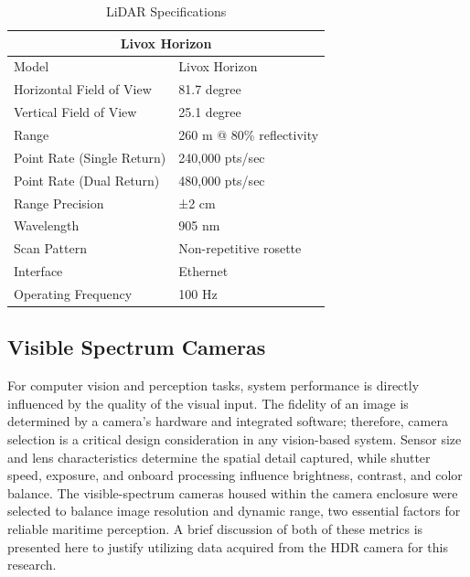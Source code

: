 \documentclass{erauthesis}
\begin{document}
\begin{table}[htpb]
\centering
\begin{tabular}{ll}
\hline
\multicolumn{2}{c}{Livox Horizon}\\
\hline
\hline
Model & Livox Horizon \\
Horizontal Field of View & 81.7 degree \\
Vertical Field of View & 25.1 degree \\
Range & 260 m @ 80\% reflectivity \\
Point Rate (Single Return) & 240,000 pts/sec \\
Point Rate (Dual Return) & 480,000 pts/sec \\
Range Precision & ±2 cm \\
Wavelength & 905 nm \\
Scan Pattern & Non-repetitive rosette \\
Interface & Ethernet \\
Operating Frequency & 100 Hz \\
\hline
\end{tabular}
\caption{LiDAR Specifications}
\label{table:livox_horizon_specs}
\end{table}

\subsection{Visible Spectrum Cameras} \label{visual_cameras}


For computer vision and perception tasks, system performance is directly influenced by the quality of the visual input.
The fidelity of an image is determined by a camera's hardware and integrated software; therefore, camera selection is a critical design consideration in any vision-based system. 
Sensor size and lens characteristics determine the spatial detail captured, while shutter speed, exposure, and onboard processing influence brightness, contrast, and color balance. 
The visible-spectrum cameras housed within the camera enclosure were selected to balance image resolution and dynamic range, two essential factors for reliable maritime perception.
A brief discussion of both of these metrics is presented here to justify utilizing data acquired from the \ac{HDR} camera for this research.
\end{document}
